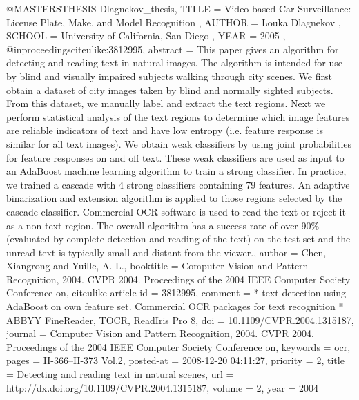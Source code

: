 @MASTERSTHESIS { Dlagnekov_thesis,
    TITLE = { Video-based Car Surveillance: License Plate, Make, and Model Recognition },
    AUTHOR = { Louka Dlagnekov },
    SCHOOL = { University of California, San Diego },
    YEAR = { 2005 },
}
@inproceedings{citeulike:3812995,
	abstract = {This paper gives an algorithm for detecting and reading text in natural images. The algorithm is intended for use by blind and visually impaired subjects walking through city scenes. We first obtain a dataset of city images taken by blind and normally sighted subjects. From this dataset, we manually label and extract the text regions. Next we perform statistical analysis of the text regions to determine which image features are reliable indicators of text and have low entropy (i.e. feature response is similar for all text images). We obtain weak classifiers by using joint probabilities for feature responses on and off text. These weak classifiers are used as input to an AdaBoost machine learning algorithm to train a strong classifier. In practice, we trained a cascade with 4 strong classifiers containing 79 features. An adaptive binarization and extension algorithm is applied to those regions selected by the cascade classifier. Commercial OCR software is used to read the text or reject it as a non-text region. The overall algorithm has a success rate of over 90\% (evaluated by complete detection and reading of the text) on the test set and the unread text is typically small and distant from the viewer.},
	author = {Chen, Xiangrong and Yuille, A. L.},
	booktitle = {Computer Vision and Pattern Recognition, 2004. CVPR 2004. Proceedings of the 2004 IEEE Computer Society Conference on},
	citeulike-article-id = {3812995},
	comment = {* text detection using AdaBoost on own feature set. Commercial OCR packages for text recognition
* ABBYY FineReader, TOCR, ReadIris Pro 8},
	doi = {10.1109/CVPR.2004.1315187},
	journal = {Computer Vision and Pattern Recognition, 2004. CVPR 2004. Proceedings of the 2004 IEEE Computer Society Conference on},
	keywords = {ocr},
	pages = {II-366--II-373 Vol.2},
	posted-at = {2008-12-20 04:11:27},
	priority = {2},
	title = {Detecting and reading text in natural scenes},
	url = {http://dx.doi.org/10.1109/CVPR.2004.1315187},
	volume = {2},
	year = {2004}
}

	


